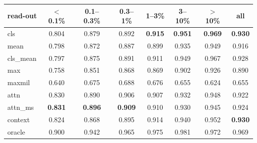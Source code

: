 \begin{tabular}{lccccccc}
\toprule
read-out & $<$0.1\% & 0.1--0.3\% & 0.3--1\% & 1--3\% & 3--10\% & $>$10\% & all \\
\midrule
cls & 0.804 & 0.879 & 0.892 & \textbf{0.915} & \textbf{0.951} & \textbf{0.969} & \textbf{0.930} \\
mean & 0.798 & 0.872 & 0.887 & 0.899 & 0.935 & 0.949 & 0.916 \\
cls\_mean & 0.797 & 0.875 & 0.891 & 0.911 & 0.949 & 0.967 & 0.928 \\
max & 0.758 & 0.851 & 0.868 & 0.869 & 0.902 & 0.926 & 0.890 \\
maxmil & 0.640 & 0.675 & 0.688 & 0.676 & 0.655 & 0.624 & 0.655 \\
attn & 0.830 & 0.890 & 0.906 & 0.907 & 0.932 & 0.948 & 0.922 \\
attn\_ms & \textbf{0.831} & \textbf{0.896} & \textbf{0.909} & 0.910 & 0.930 & 0.945 & 0.924 \\
context & 0.824 & 0.868 & 0.895 & 0.914 & 0.940 & 0.952 & \textbf{0.930} \\
\midrule
oracle & 0.900 & 0.942 & 0.965 & 0.975 & 0.981 & 0.972 & 0.969 \\
\bottomrule
\end{tabular}
